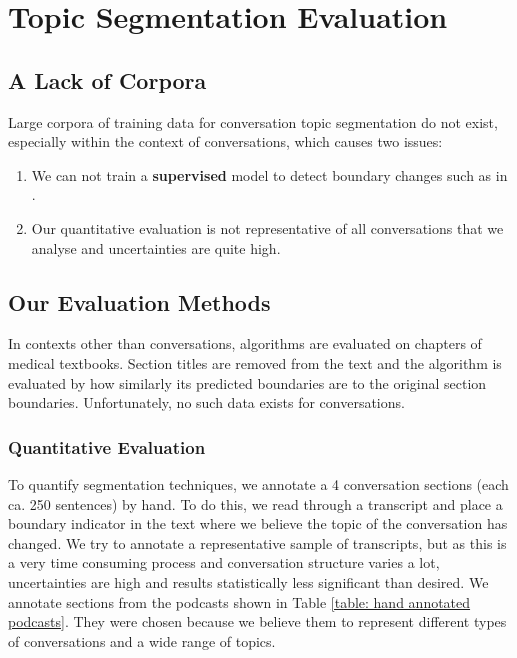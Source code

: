 \section{Topic Segmentation Evaluation}
\subsection{A Lack of Corpora}
    Large corpora of training data for conversation topic segmentation do not exist, especially within the context of conversations, which causes two issues:
    \begin{enumerate}
        \item We can not train a \textbf{supervised} \gls{model} to detect boundary changes such as in \cite{joty2013topic}.
        \item Our quantitative evaluation is not representative of all conversations that we analyse and uncertainties are quite high.
    \end{enumerate}

\subsection{Our Evaluation Methods \label{method: segmentation evaluation}}
    In contexts other than conversations, algorithms are evaluated on chapters of medical textbooks\cite{eisenstein2008bayesian, simon2013leveraging}. Section titles are removed from the text and the algorithm is evaluated by how similarly its predicted boundaries are to the original section boundaries. Unfortunately, no such data exists for conversations.

    \subsubsection{Quantitative Evaluation}
        To quantify segmentation techniques, we annotate a 4 conversation sections (each ca. 250 sentences) by hand. To do this, we read through a transcript and place a boundary indicator in the text where we believe the topic of the conversation has changed. We try to annotate a representative sample of transcripts, but as this is a very time consuming process and conversation structure varies a lot, uncertainties are high and results statistically less significant than desired. We annotate sections from the podcasts shown in Table \ref{table: hand annotated podcasts}. They were chosen because we believe them to represent different types of conversations and a wide range of topics.

